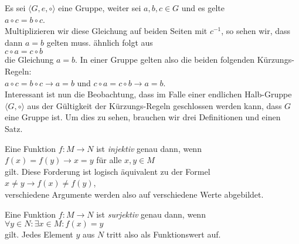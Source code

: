 \remark Es sei $\langle G, e, \circ \rangle$ eine Gruppe, weiter sei $a,b,c \in G$ und es gelte
\\[0.2cm]
\hspace*{1.3cm} $a \circ c = b \circ c$.
\\[0.2cm]
Multiplizieren wir diese Gleichung auf beiden Seiten mit $c^{-1}$, so sehen wir, dass dann $a = b$ gelten
muss.  \"{a}hnlich folgt aus
\\[0.2cm]
\hspace*{1.3cm} $c \circ a = c \circ b$
\\[0.2cm]
die Gleichung $a = b$.  In einer Gruppe gelten also die beiden folgenden K\"{u}rzungs-Regeln:
\\[0.2cm]
\hspace*{1.3cm} 
$a \circ c = b \circ c \rightarrow a = b$ \quad und \quad
$c \circ a = c \circ b \rightarrow a = b$.
\\[0.2cm]
Interessant ist nun die Beobachtung, dass im Falle einer endlichen Halb-Gruppe 
$\langle G, \circ \rangle$ aus der G\"{u}ltigkeit der  
K\"{u}rzungs-Regeln geschlossen werden kann, dass $G$ eine Gruppe ist.
Um dies zu sehen, brauchen wir drei Definitionen und einen Satz.
\eox

\begin{Definition}[injektiv]
  Eine Funktion $f: M \rightarrow N$ ist \emph{injektiv} genau dann, wenn
  \\[0.2cm]
  \hspace*{1.3cm}
  $f(x) = f(y) \rightarrow x = y$ \quad f\"{u}r alle $x,y\in M$ 
  \\[0.2cm]
  gilt.  Diese Forderung ist logisch \"{a}quivalent zu der Formel
  \\[0.2cm]
  \hspace*{1.3cm}
  $x \not= y \rightarrow f(x) \not= f(y)$,
  \\[0.2cm]
  verschiedene Argumente werden also auf verschiedene Werte abgebildet.
\eox
\end{Definition}

\begin{Definition}[surjektiv]
  Eine Funktion $f: M \rightarrow N$ ist \emph{surjektiv} genau dann, wenn
  \\[0.2cm]
  \hspace*{1.3cm}
  $\forall y \in N: \exists x \in M: f(x) = y$ 
  \\[0.2cm]
  gilt.  Jedes Element $y$ aus $N$ tritt also als Funktionswert auf.
\eox
\end{Definition}

